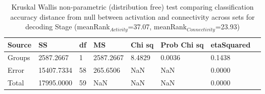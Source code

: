 \begin{table}
\centering
\begin{tabular}[0.2em]{@{}llllllll@{}}\toprule
Source & SS & df & MS & Chi sq & Prob Chi sq & etaSquared\\\toprule[0.2em]
Groups & 2587.2667 & 1 & 2587.2667 & 8.4829 & 0.0036 & 0.1438 \\\midrule
Error & 15407.7334 & 58 & 265.6506 & NaN & NaN & 0.0000 \\\midrule
Total & 17995.0000 & 59 & NaN & NaN & NaN & 0.0000 \\\bottomrule[0.2em]
\end{tabular}
\caption{Kruskal Wallis non-parametric (distribution free) test comparing classification accuracy distance from null between activation and connectivity across sets for decoding Stage (meanRank$_{Activity}$=37.07, meanRank$_{Connectivity}$=23.93)\label{tabel:null}}
\end{table}
